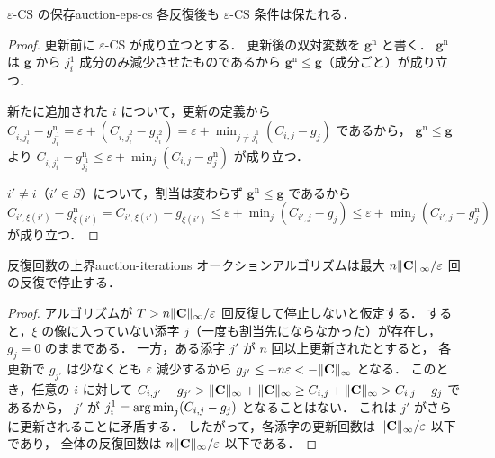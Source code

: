 \begin{proposition}{$\varepsilon$-CS の保存}{auction-eps-cs}
  各反復後も $\varepsilon$-CS 条件は保たれる．
\end{proposition}

\begin{proof}
  更新前に $\varepsilon$-CS が成り立つとする．
  更新後の双対変数を $\mathbf{g}^{\mathrm{n}}$ と書く．
  $\mathbf{g}^{\mathrm{n}}$ は $\mathbf{g}$ から $j_i^1$ 成分のみ減少させたものであるから
  $\mathbf{g}^{\mathrm{n}} \leq \mathbf{g}$（成分ごと）が成り立つ．

  新たに追加された $i$ について，更新の定義から
  $C_{i, j_i^1} - g^{\mathrm{n}}_{j_i^1} = \varepsilon + (C_{i, j_i^2} - g_{j_i^2})
  = \varepsilon + \min_{j \neq j_i^1}(C_{i,j} - g_j)$ であるから，
  $\mathbf{g}^{\mathrm{n}} \leq \mathbf{g}$ より
  $C_{i, j_i^1} - g^{\mathrm{n}}_{j_i^1}
  \leq \varepsilon + \min_j (C_{i,j} - g^{\mathrm{n}}_j)$ が成り立つ．

  $i' \neq i$（$i' \in S$）について，割当は変わらず $\mathbf{g}^{\mathrm{n}} \leq \mathbf{g}$ であるから
  $C_{i', \xi(i')} - g^{\mathrm{n}}_{\xi(i')}
  = C_{i', \xi(i')} - g_{\xi(i')}
  \leq \varepsilon + \min_j (C_{i',j} - g_j)
  \leq \varepsilon + \min_j (C_{i',j} - g^{\mathrm{n}}_j)$ が成り立つ．
\end{proof}

\begin{proposition}{反復回数の上界}{auction-iterations}
  オークションアルゴリズムは最大 $n \lVert \mathbf{C} \rVert_\infty / \varepsilon$ 回の反復で停止する．
\end{proposition}

\begin{proof}
  アルゴリズムが $T > n\lVert \mathbf{C} \rVert_\infty / \varepsilon$ 回反復して停止しないと仮定する．
  すると，$\xi$ の像に入っていない添字 $j$（一度も割当先にならなかった）が存在し，
  $g_j = 0$ のままである．
  一方，ある添字 $j'$ が $n$ 回以上更新されたとすると，
  各更新で $g_{j'}$ は少なくとも $\varepsilon$ 減少するから
  $g_{j'} \leq -n\varepsilon < -\lVert \mathbf{C} \rVert_\infty$ となる．
  このとき，任意の $i$ に対して
  $C_{i,j'} - g_{j'} > \lVert \mathbf{C} \rVert_\infty + \lVert \mathbf{C} \rVert_\infty
  \geq C_{i,j} + \lVert \mathbf{C} \rVert_\infty > C_{i,j} - g_j$ であるから，
  $j'$ が $j_i^1 = \operatorname*{arg\,min}_j (C_{i,j} - g_j)$ となることはない．
  これは $j'$ がさらに更新されることに矛盾する．
  したがって，各添字の更新回数は $\lVert \mathbf{C} \rVert_\infty / \varepsilon$ 以下であり，
  全体の反復回数は $n\lVert \mathbf{C} \rVert_\infty / \varepsilon$ 以下である．
\end{proof}


